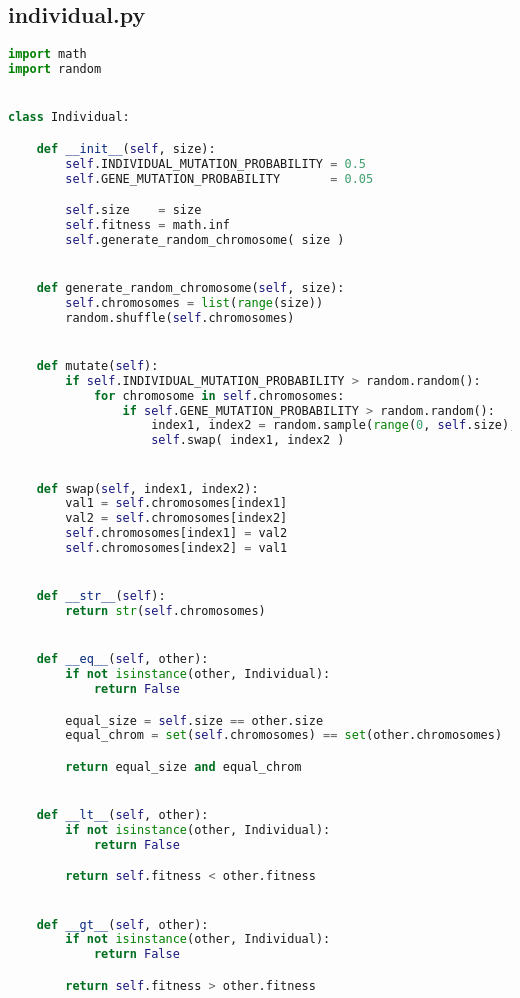 \newpage

\subsection*{individual.py}
\begin{lstlisting}[language=python]
import math
import random


class Individual:

    def __init__(self, size):
        self.INDIVIDUAL_MUTATION_PROBABILITY = 0.5
        self.GENE_MUTATION_PROBABILITY       = 0.05

        self.size    = size
        self.fitness = math.inf
        self.generate_random_chromosome( size )


    def generate_random_chromosome(self, size):
        self.chromosomes = list(range(size))
        random.shuffle(self.chromosomes)


    def mutate(self):
        if self.INDIVIDUAL_MUTATION_PROBABILITY > random.random():
            for chromosome in self.chromosomes:
                if self.GENE_MUTATION_PROBABILITY > random.random():
                    index1, index2 = random.sample(range(0, self.size), 2)
                    self.swap( index1, index2 )


    def swap(self, index1, index2):
        val1 = self.chromosomes[index1]
        val2 = self.chromosomes[index2]
        self.chromosomes[index1] = val2
        self.chromosomes[index2] = val1


    def __str__(self):
        return str(self.chromosomes)


    def __eq__(self, other):
        if not isinstance(other, Individual):
            return False

        equal_size = self.size == other.size
        equal_chrom = set(self.chromosomes) == set(other.chromosomes)

        return equal_size and equal_chrom


    def __lt__(self, other):
        if not isinstance(other, Individual):
            return False

        return self.fitness < other.fitness


    def __gt__(self, other):
        if not isinstance(other, Individual):
            return False

        return self.fitness > other.fitness
\end{lstlisting}